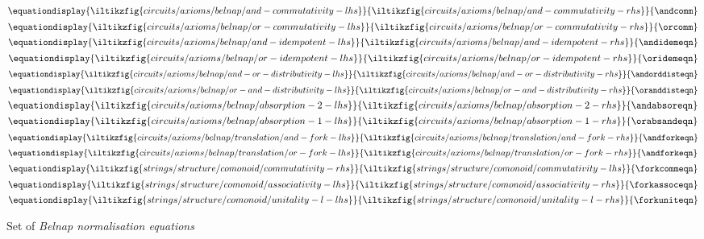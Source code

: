 \documentclass[10pt]{article}
\begin{document}
\begin{figure}[p]
{    }{
    }{\orassoc}\)
    \\[1em]
    \(\equationdisplay{
        \iltikzfig{circuits/axioms/belnap/and-commutativity-lhs}
    }{
        \iltikzfig{circuits/axioms/belnap/and-commutativity-rhs}
    }{\andcomm}\)
    \quad
    \(\equationdisplay{
        \iltikzfig{circuits/axioms/belnap/or-commutativity-lhs}
    }{
        \iltikzfig{circuits/axioms/belnap/or-commutativity-rhs}
    }{\orcomm}\)
    \quad
    \(\equationdisplay{
        \iltikzfig{circuits/axioms/belnap/and-idempotent-lhs}
    }{
        \iltikzfig{circuits/axioms/belnap/and-idempotent-rhs}
    }{\andidemeqn}\)
    \quad
    \(\equationdisplay{
        \iltikzfig{circuits/axioms/belnap/or-idempotent-lhs}
    }{
        \iltikzfig{circuits/axioms/belnap/or-idempotent-rhs}
    }{\oridemeqn}\)
    \\[1em]
    \(\equationdisplay{
        \iltikzfig{circuits/axioms/belnap/and-or-distributivity-lhs}
    }{
        \iltikzfig{circuits/axioms/belnap/and-or-distributivity-rhs}
    }{\andorddisteqn}\)
    \quad
    \(\equationdisplay{
        \iltikzfig{circuits/axioms/belnap/or-and-distributivity-lhs}
    }{
        \iltikzfig{circuits/axioms/belnap/or-and-distributivity-rhs}
    }{\oranddisteqn}\)
    \\[1em]
    \(\equationdisplay{
        \iltikzfig{circuits/axioms/belnap/absorption-2-lhs}
    }{
        \iltikzfig{circuits/axioms/belnap/absorption-2-rhs}
    }{\andabsoreqn}\)
    \quad
    \(\equationdisplay{
        \iltikzfig{circuits/axioms/belnap/absorption-1-lhs}
    }{
        \iltikzfig{circuits/axioms/belnap/absorption-1-rhs}
    }{\orabsandeqn}\)
    \quad
    \(\equationdisplay{
        \iltikzfig{circuits/axioms/belnap/translation/and-fork-lhs}
    }{
        \iltikzfig{circuits/axioms/belnap/translation/and-fork-rhs}
    }{\andforkeqn}\)
    \quad
    \(\equationdisplay{
        \iltikzfig{circuits/axioms/belnap/translation/or-fork-lhs}
    }{
        \iltikzfig{circuits/axioms/belnap/translation/or-fork-rhs}
    }{\andforkeqn}\)
    \\[1em]
    \(\equationdisplay{
        \iltikzfig{strings/structure/comonoid/commutativity-rhs}
    }{
        \iltikzfig{strings/structure/comonoid/commutativity-lhs}
    }{\forkcommeqn}\)
    \quad
    \(\equationdisplay{
        \iltikzfig{strings/structure/comonoid/associativity-lhs}
    }{
        \iltikzfig{strings/structure/comonoid/associativity-rhs}
    }{\forkassoceqn}\)
    \quad
    \(\equationdisplay{
        \iltikzfig{strings/structure/comonoid/unitality-l-lhs}
    }{
        \iltikzfig{strings/structure/comonoid/unitality-l-rhs}
    }{\forkuniteqn}\)
    \caption{
        Set of \emph{Belnap normalisation equations}
    }
    \label{fig:normal-form-equations}
\end{figure}
\end{document}
